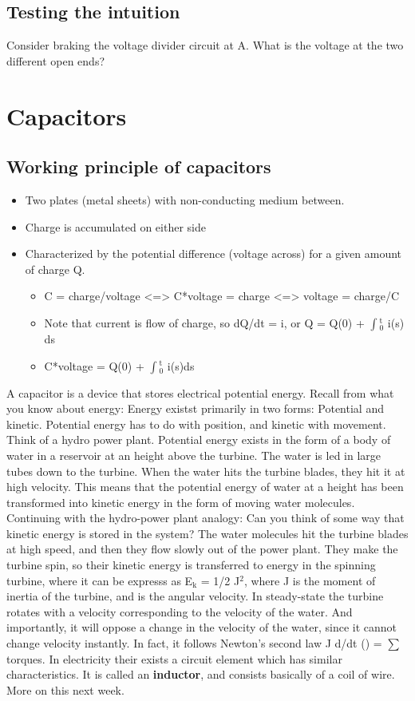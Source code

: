 \documentclass[a4paper]{scrartcl}
\begin{document}
\subsection{Testing the intuition}
\label{sec-1-3}
Consider braking the voltage divider circuit at A. What is the voltage at the two different open ends?

\section{Capacitors}
\label{sec-2}
\subsection{Working principle of capacitors}
\label{sec-2-1}
\begin{itemize}
\item Two plates (metal sheets) with non-conducting medium between.
\item Charge is accumulated on either side
\item Characterized by the potential difference (voltage across) for a given amount of charge Q.
\begin{itemize}
\item C = charge/voltage <=> C*voltage = charge <=> voltage = charge/C
\item Note that current is flow of charge, so dQ/dt = i, or Q = Q(0) + $\int$$_{\text{0}}^{\text{t}}$ i(s) ds
\item C*voltage = Q(0) + $\int$$_{\text{0}}^{\text{t}}$ i(s)ds
\end{itemize}
\end{itemize}

A capacitor is a device that stores electrical potential energy. Recall from what you know about energy: Energy existst primarily in two forms: Potential and kinetic. Potential energy has to do with position, and kinetic with movement. Think of a hydro power plant. Potential energy exists in the form of a body of water in a reservoir at an height above the turbine. The water is led in large tubes down to the turbine. When the water hits the turbine blades, they hit it at high velocity. This means that the potential energy of water at a height has been transformed into kinetic energy in the form of moving water molecules.
Continuing with the hydro-power plant analogy: Can you think of some way that kinetic energy is stored in the system?
The water molecules hit the turbine blades at high speed, and then they flow slowly out of the power plant. They make the turbine spin, so their kinetic energy is transferred to energy in the spinning turbine, where it can be expresss as E$_{\text{k}}$ = 1/2 J\dot{\theta}$^{\text{2}}$, where J is the moment of inertia of the turbine, and \dot{\theta} is the angular velocity. In steady-state the turbine rotates with a velocity corresponding to the velocity of the water. And importantly, it will oppose a change in the velocity of the water, since it cannot change velocity instantly. In fact, it follows Newton's second law J d/dt (\dot{\theta}) = $\sum$ torques. 
In electricity their exists a circuit element which has similar characteristics. It is called an \textbf{inductor}, and consists basically of a coil of wire. More on this next week.
\end{document}
